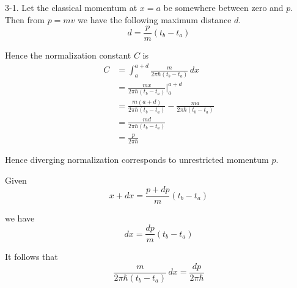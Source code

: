 \documentclass[12pt]{article}
\begin{document}
3-1.
Let the classical momentum at $x=a$ be somewhere between zero and $p$.
Then from $p=mv$ we have the following maximum distance $d$.
\begin{equation*}
d=\frac{p}{m}(t_b-t_a)
\end{equation*}

\noindent
Hence the normalization constant $C$ is
\begin{align*}
C&=\int_a^{a+d}\frac{m}{2\pi\hbar(t_b-t_a)}\,dx
\\[1ex]
&=\frac{mx}{2\pi\hbar(t_b-t_a)}\bigg|_a^{a+d}
\\[1ex]
&=\frac{m(a+d)}{2\pi\hbar(t_b-t_a)}-\frac{ma}{2\pi\hbar(t_b-t_a)}
\\[1ex]
&=\frac{md}{2\pi\hbar(t_b-t_a)}
\\[1ex]
&=\frac{p}{2\pi\hbar}
\end{align*}

\noindent
Hence diverging normalization corresponds to unrestricted momentum $p$.

\bigskip
\noindent
Given
\begin{equation*}
x+dx=\frac{p+dp}{m}(t_b-t_a)
\end{equation*}

\noindent
we have
\begin{equation*}
dx=\frac{dp}{m}(t_b-t_a)
\end{equation*}

\noindent
It follows that
\begin{equation*}
\frac{m}{2\pi\hbar(t_b-t_a)}\,dx=\frac{dp}{2\pi\hbar}
\end{equation*}
\end{document}
